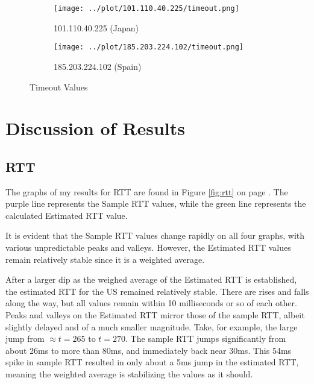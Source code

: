 \documentclass[11pt]{article}
\begin{document}
\begin{landscape}
\begin{figure}[H]
      \medskip

      \begin{subfigure}[t]{.675\textwidth}
        \centering
        \texttt{[image: ../plot/101.110.40.225/timeout.png]}
        \caption{101.110.40.225 (Japan)}
      \end{subfigure}
      \hfill
      \begin{subfigure}[t]{.675\textwidth}
        \centering
        \texttt{[image: ../plot/185.203.224.102/timeout.png]}
        \caption{185.203.224.102 (Spain)}
      \end{subfigure}

      \caption{Timeout Values}
      \label{fig:timeout}
    \end{figure}
    \clearpage
  \end{landscape}
  
  \section{Discussion of Results}
  \subsection{RTT}

  The graphs of my results for RTT are found in Figure \ref{fig:rtt} on page \pageref{fig:rtt}. 
  The purple line represents the Sample RTT values, while the green line represents the calculated 
  Estimated RTT value.

  It is evident that the Sample RTT values change rapidly on all four graphs, with various unpredictable 
  peaks and valleys. However, the Estimated RTT values remain relatively stable since it is a 
  weighted average. 

  After a larger dip as the weighed average of the Estimated RTT is established, the estimated RTT 
  for the US remained relatively stable. There are rises and falls along the way, but all values remain 
  within 10 milliseconds or so of each other. Peaks and valleys on the Estimated RTT mirror those of 
  the sample RTT, albeit slightly delayed and of a much smaller magnitude. Take, for example, the 
  large jump from $\approx t=265 \text{ to } t=270$. The sample RTT jumps significantly from 
  about 26ms to more than 80ms, and immediately back near 30ms. This 54ms spike in sample RTT 
  resulted in only about a 5ms jump in the estimated RTT, meaning the weighted average is 
  stabilizing the values as it should.
\end{document}
